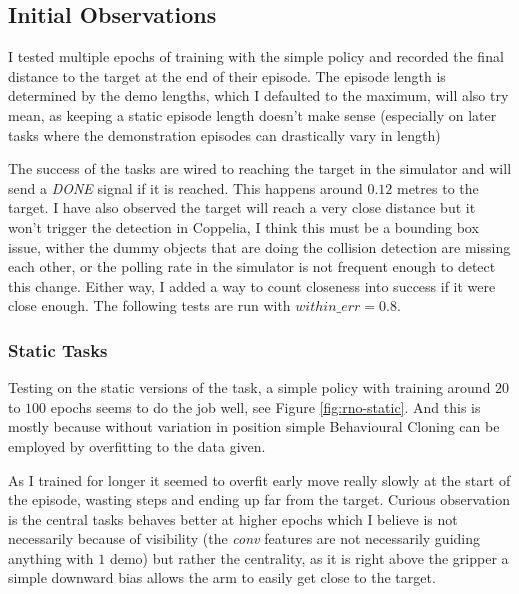 

\subsection{Initial Observations}
I tested multiple epochs of training with the simple policy and recorded the final distance to the target at the end of their episode. The episode length is determined by the demo lengths, which I defaulted to the maximum, will also try mean, as keeping a static episode length doesn't make sense (especially on later tasks where the demonstration episodes can drastically vary in length)

The success of the tasks are wired to reaching the target in the simulator and will send a \emph{DONE} signal if it is reached. This happens around $0.12$ metres to the target. I have also observed the target will reach a very close distance but it won't trigger the detection in Coppelia, I think this must be a bounding box issue, wither the dummy objects that are doing the collision detection are missing each other, or the polling rate in the simulator is not frequent enough to detect this change. Either way, I added a way to count closeness into success if it were close enough. The following tests are run with \(within\_err = 0.8\).

\subsubsection{Static Tasks}
Testing on the static versions of the task, a simple policy with training around $20$ to $100$ epochs seems to do the job well, see Figure \ref{fig:rno-static}. And this is mostly because without variation in position simple Behavioural Cloning can be employed by overfitting to the data given. 

As I trained for longer it seemed to overfit early move really slowly at the start of the episode, wasting steps and ending up far from the target. Curious observation is \todo[color=purple]{} the central tasks behaves better at higher epochs which I believe is not necessarily because of visibility (the \emph{conv} features are not necessarily guiding anything with $1$ demo) but rather the centrality, as it is right above the gripper a simple downward bias allows the arm to easily get close to the target.

